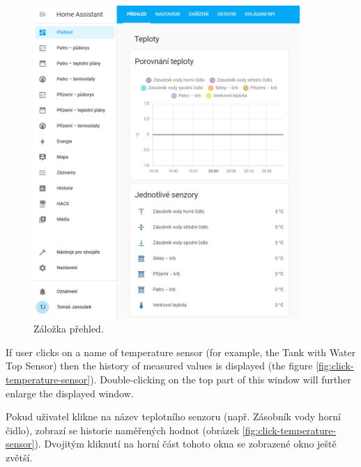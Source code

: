 \begin{Czech}
\begin{figure}[H]
    \centering
    \includegraphics[width=0.9\textwidth]{pictures/czech/software/overview-tab.png}
    \caption{Záložka přehled.}
    \label{fig:overview-tab}
\end{figure}
\end{Czech}


\begin{English}
If user clicks on a name of temperature sensor (for example, the Tank with Water Top Sensor) then the history of measured values is displayed (the figure \ref{fig:click-temperature-sensor}). 
Double-clicking on the top part of this window will further enlarge the displayed window. 
\end{English}

\begin{Czech}
Pokud uživatel klikne na název teplotního senzoru (např. Zásobník vody horní čidlo), zobrazí se historie naměřených hodnot (obrázek \ref{fig:click-temperature-sensor}). Dvojitým kliknutí na horní část tohoto okna se zobrazené okno ještě zvětší.
\end{Czech}


